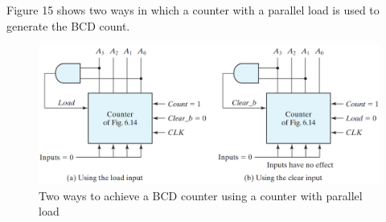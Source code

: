 \newpage

Figure 15 shows two ways in which a counter with a parallel load is used to generate the BCD count.
\begin{figure}[H]
  \centering
  \includegraphics[width=\linewidth]{img/fig-6.15.png}
  \caption{Two ways to achieve a BCD counter using a counter with parallel load}
  \label{fig:6.15}
\end{figure}


